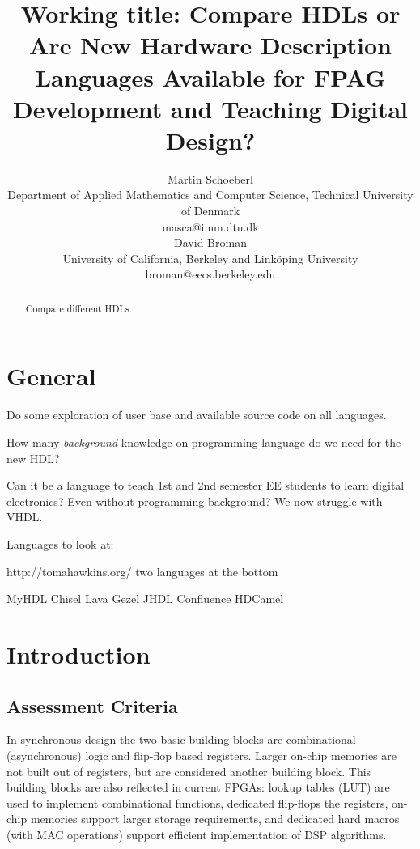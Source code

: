 \documentclass[10pt, conference, compsocconf]{IEEEtran}
\begin{document}
\title{Working title: Compare HDLs or\\
Are New Hardware Description Languages Available for FPAG
Development and Teaching Digital Design?}

\author{Martin Schoeberl\\
Department of Applied Mathematics and Computer Science, 
Technical University of Denmark\\masca@imm.dtu.dk
  \vspace{1ex}\\ 
David Broman\\
University of California, Berkeley and Link{\"o}ping University\\
broman@eecs.berkeley.edu
}



\maketitle \thispagestyle{empty}

\begin{abstract}
Compare different HDLs.
\end{abstract}

\section{General}

Do some exploration of user base and available source code on all languages.

How many \emph{background} knowledge on programming language do we need for the new HDL?

Can it be a language to teach 1st and 2nd semester EE students to learn digital
electronics? Even without programming background? We now struggle with VHDL.

Languages to look at:

http://tomahawkins.org/ two languages at the bottom

MyHDL
Chisel
Lava
Gezel
JHDL
Confluence
HDCamel


\section{Introduction}

\subsection{Assessment Criteria}


In synchronous design the two basic building blocks are combinational
(asynchronous) logic and flip-flop based registers. Larger on-chip
memories are not built out of registers, but are considered another building
block. This building blocks are also reflected in current FPGAs: lookup tables
(LUT) are used to implement combinational functions, dedicated flip-flops
the registers, on-chip memories support larger storage requirements,
and dedicated hard macros (with MAC operations) support efficient
implementation of DSP algorithms.
\end{document}
